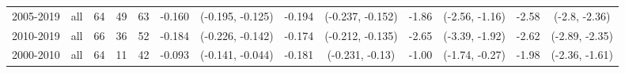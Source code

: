 \begin{table}[h]
\begin{center}
{\begin{tabular}{ll|ccc|cccc|cccc}
2005-2019 & all &              64 &          49 &          63 &                  -0.160 &  (-0.195, -0.125) & -0.194 &  (-0.237, -0.152) &                    -1.86 &  (-2.56, -1.16) & -2.58 &   (-2.8, -2.36) \\
2010-2019 & all &              66 &          36 &          52 &                  -0.184 &  (-0.226, -0.142) & -0.174 &  (-0.212, -0.135) &                    -2.65 &  (-3.39, -1.92) & -2.62 &  (-2.89, -2.35) \\
2000-2010 & all &              64 &          11 &          42 &                  -0.093 &  (-0.141, -0.044) & -0.181 &   (-0.231, -0.13) &                    -1.00 &  (-1.74, -0.27) & -1.98 &  (-2.36, -1.61) \\
\bottomrule
\end{tabular}}
\end{center}
\end{table}



